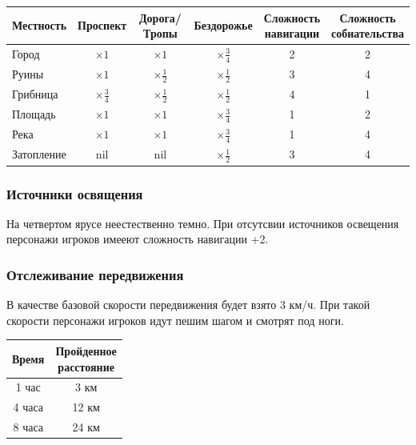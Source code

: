 \begin{table}[H]
  \centering
  \def\arraystretch{1.5}
  \begin{tabular}{*6{c}}
    \toprule
    Местность & Проспект & Дорога/Тропы & Бездорожье & \makecell{Сложность \\ навигации} & \makecell{Сложность \\ собиательства} \\
    \midrule
    \multicolumn{1}{l}{Город}       & $\times 1$           & $\times 1$           & $\times \frac{3}{4}$ & 2 & 2 \\
    \multicolumn{1}{l}{Руины}       & $\times 1$           & $\times \frac{1}{2}$ & $\times \frac{1}{2}$ & 3 & 4 \\
    \multicolumn{1}{l}{Грибница}    & $\times \frac{3}{4}$ & $\times \frac{1}{2}$ & $\times \frac{1}{2}$ & 4 & 1 \\
    \multicolumn{1}{l}{Площадь}     & $\times 1$           & $\times 1$           & $\times \frac{3}{4}$ & 1 & 2 \\
    \multicolumn{1}{l}{Река}        & $\times 1$           & $\times 1$           & $\times \frac{3}{4}$ & 1 & 4 \\
    \multicolumn{1}{l}{Затопление}  & nil                  & nil                  & $\times \frac{1}{2}$ & 3 & 4 \\
    \bottomrule
  \end{tabular}
\end{table}

\subsubsection*{Источники освящения}

На четвертом ярусе неестественно темно. При отсутсвии источников освещения персонажи игроков имееют сложность навигации +2.

\subsubsection*{Отслеживание передвижения}

В качестве базовой скорости передвижения будет взято 3 км/ч. При такой скорости
персонажи игроков идут пешим шагом и смотрят под ноги.

\begin{table}[H]
  \centering
  \begin{tabular}{*2{c}}
    \toprule
    Время & \makecell{Пройденное \\ расстояние} \\
    \midrule
    1 час & 3 км\\
    4 часа & 12 км\\
    8 часа & 24 км\\
    \bottomrule
  \end{tabular}
\end{table}
